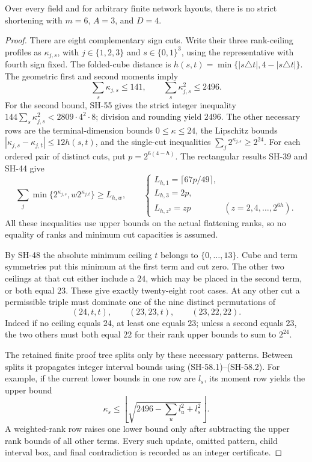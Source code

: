 \begin{theorem}
\label{thm:width-six-three-term-dimension-four}
Over every field and for arbitrary finite network layouts,
there is no strict shortening with $m=6$, $A=3$, and $D=4$.
\end{theorem}
\begin{proof}
There are eight complementary sign cuts.  Write their
three rank-ceiling profiles as $\kappa_{j,s}$, with
$j\in\{1,2,3\}$ and $s\in\{0,1\}^3$, using the
representative with fourth sign fixed.  The folded-cube
distance is $h(s,t)=\min\{|s\triangle t|,4-|s\triangle t|\}$.
The geometric first and second moments imply
\[
 \sum_s\kappa_{j,s}\leq141,
 \qquad
 \sum_s\kappa_{j,s}^2\leq2496.
 \tag{SH-58.1}
\]
For the second bound, SH-55 gives the strict integer
inequality $144\sum_s\kappa_{j,s}^2<2809\cdot4^2\cdot8$;
division and rounding yield $2496$.
The other necessary rows are the terminal-dimension
bounds $0\leq\kappa\leq24$, the Lipschitz bounds
$|\kappa_{j,s}-\kappa_{j,t}|\leq12h(s,t)$,
and the single-cut inequalities
$\sum_j2^{\kappa_{j,s}}\geq2^{24}$.
For each ordered pair of distinct cuts, put
$p=2^{6(4-h)}$.  The rectangular results SH-39 and
SH-44 give
\[
 \sum_j\min\{2^{\kappa_{j,s}},w2^{\kappa_{j,t}}\}
 \geq L_{h,w},
 \qquad
 \begin{cases}
 L_{h,1}=\lceil67p/49\rceil,\\
 L_{h,3}=2p,\\
 L_{h,z^2}=zp& (z=2,4,\ldots,2^{6h}).
 \end{cases}
 \tag{SH-58.2}
\]
All these inequalities use upper bounds on the actual
flattening ranks, so no equality of ranks and minimum
cut capacities is assumed.

By SH-48 the absolute minimum ceiling $t$ belongs to
$\{0,\ldots,13\}$.  Cube and term symmetries put this
minimum at the first term and cut zero.  The other two
ceilings at that cut either include a $24$, which may
be placed in the second term, or both equal $23$.
These give exactly twenty-eight root cases.  At any
other cut a permissible triple must dominate one of
the nine distinct permutations of
\[
             (24,t,t),\qquad(23,23,t),\qquad(23,22,22).
 \tag{SH-58.3}
\]
Indeed if no ceiling equals $24$, at least one equals
$23$; unless a second equals $23$, the two others
must both equal $22$ for their rank upper bounds
to sum to $2^{24}$.

The retained finite proof tree splits only by these
necessary patterns.  Between splits it propagates
integer interval bounds using (SH-58.1)--(SH-58.2).
For example, if the current lower bounds in one row
are $l_s$, its moment row yields the upper bound
\[
 \kappa_s\leq
 \left\lfloor\sqrt{2496-\sum_u l_u^2+l_s^2}\right\rfloor.
\]
A weighted-rank row raises one lower bound only after
subtracting the upper rank bounds of all other terms.
Every such update, omitted pattern, child interval box,
and final contradiction is recorded as an integer
certificate.


\end{proof}
